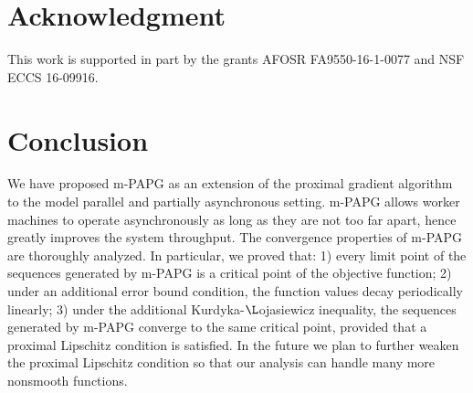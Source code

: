 \documentclass[leqno,onefignum,onetabnum]{siamart0516}
\newcommand{\mspg}{\textsf{m-PAPG}\xspace}
\begin{document}
\section*{Acknowledgment}
This work is supported in part by the grants AFOSR FA9550-16-1-0077 and NSF ECCS 16-09916.

\section{Conclusion}\label{sec: conclude}
We have proposed \mspg as an extension of the proximal gradient algorithm to the model parallel and partially asynchronous setting. 
\mspg allows worker machines to operate asynchronously as long as they are not too far apart, hence greatly improves the system throughput.
The convergence properties of \mspg are thoroughly analyzed. In particular, we proved that: 1) every limit point of the sequences generated by \mspg is a critical point of the objective function; 2) under an additional error bound condition, the function values decay periodically linearly; 3) under the additional Kurdyka-${\L}$ojasiewicz inequality, the sequences generated by \mspg converge to the same critical point, provided that a proximal Lipschitz condition is satisfied.
%
In the future we plan to further weaken the proximal Lipschitz condition so that our analysis can handle many more nonsmooth functions.



%











 






\end{document}
